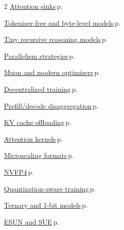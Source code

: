 \documentclass[10pt,a4paper,openany]{report}
\begin{document}
\begin{multicols}{2}
\hyperref[c:arch-8]{Attention sinks}\,{\color{muted}\scriptsize p.\,\pageref{c:arch-8}}\par\vspace{1pt}
\hyperref[c:arch-9]{Tokenizer-free and byte-level models}\,{\color{muted}\scriptsize p.\,\pageref{c:arch-9}}\par\vspace{1pt}
\hyperref[c:arch-10]{Tiny recursive reasoning models}\,{\color{muted}\scriptsize p.\,\pageref{c:arch-10}}\par\vspace{1pt}
\hyperref[c:training-0]{Parallelism strategies}\,{\color{muted}\scriptsize p.\,\pageref{c:training-0}}\par\vspace{1pt}
\hyperref[c:training-2]{Muon and modern optimizers}\,{\color{muted}\scriptsize p.\,\pageref{c:training-2}}\par\vspace{1pt}
\hyperref[c:training-8]{Decentralized training}\,{\color{muted}\scriptsize p.\,\pageref{c:training-8}}\par\vspace{1pt}
\hyperref[c:inference-3]{Prefill/decode disaggregation}\,{\color{muted}\scriptsize p.\,\pageref{c:inference-3}}\par\vspace{1pt}
\hyperref[c:inference-4]{KV cache offloading}\,{\color{muted}\scriptsize p.\,\pageref{c:inference-4}}\par\vspace{1pt}
\hyperref[c:inference-5]{Attention kernels}\,{\color{muted}\scriptsize p.\,\pageref{c:inference-5}}\par\vspace{1pt}
\hyperref[c:quant-0]{Microscaling formats}\,{\color{muted}\scriptsize p.\,\pageref{c:quant-0}}\par\vspace{1pt}
\hyperref[c:quant-1]{NVFP4}\,{\color{muted}\scriptsize p.\,\pageref{c:quant-1}}\par\vspace{1pt}
\hyperref[c:quant-4]{Quantization-aware training}\,{\color{muted}\scriptsize p.\,\pageref{c:quant-4}}\par\vspace{1pt}
\hyperref[c:quant-6]{Ternary and 1-bit models}\,{\color{muted}\scriptsize p.\,\pageref{c:quant-6}}\par\vspace{1pt}
\hyperref[c:hardware-4]{ESUN and SUE}\,{\color{muted}\scriptsize p.\,\pageref{c:hardware-4}}\par\vspace{1pt}

\end{multicols}
\end{document}
